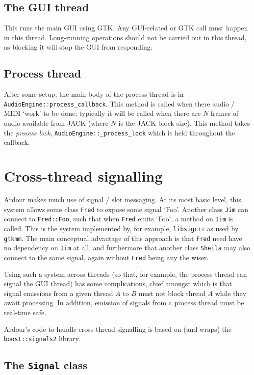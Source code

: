 \documentclass[10pt,a4paper]{book}
\newcommand{\code}[1]{\texttt{#1}}
\begin{document}
\subsection{The GUI thread}

This runs the main GUI using GTK\@.  Any GUI-related or GTK call must
happen in this thread.  Long-running operations should not be carried
out in this thread, as blocking it will stop the GUI from responding.

\subsection{Process thread}

After some setup, the main body of the process thread is in
\code{AudioEngine::process\_callback}.  This method is called when
there audio / MIDI `work' to be done; typically it will be called when
there are $N$ frames of audio available from JACK (where $N$ is the
JACK block size).  This method takes the \textit{process lock},
\code{AudioEngine::\_process\_lock} which is held throughout the
callback.


\section{Cross-thread signalling}

Ardour makes much use of signal / slot messaging.  At its most basic
level, this system allows some class \code{Fred} to expose some
signal `Foo'.  Another class \code{Jim} can connect to
\code{Fred::Foo}, such that when \code{Fred} emits `Foo', a method
on \code{Jim} is called.  This is the system implemented by, for
example, \code{libsigc++} as used by \code{gtkmm}.  The main
conceptual advantage of this approach is that \code{Fred} need have
no dependency on \code{Jim} at all, and furthermore that another
class \code{Sheila} may also connect to the same signal, again
without \code{Fred} being any the wiser.

Using such a system across threads (so that, for example, the process
thread can signal the GUI thread) has some complications, chief
amongst which is that signal emissions from a given thread $A$ to $B$
must not block thread $A$ while they await processing.  In addition,
emission of signals from a process thread must be real-time safe.

Ardour's code to handle cross-thread signalling is based on (and
wraps) the \code{boost::signals2} library.

\subsection{The \code{Signal} class}
\end{document}
